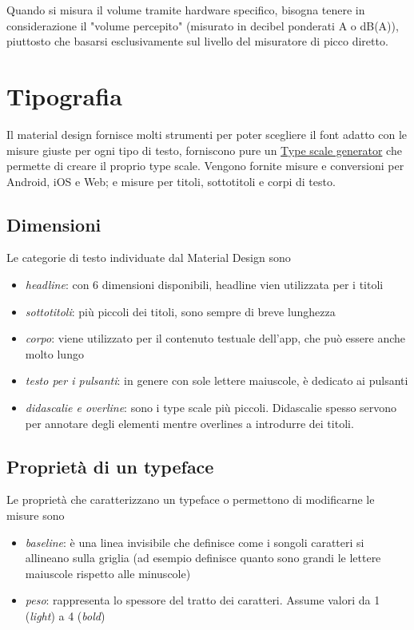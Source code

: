 \documentclass[12pt, a4paper]{report}
\begin{document}
                Quando si misura il volume tramite hardware specifico, bisogna tenere in considerazione il "volume percepito" (misurato in decibel ponderati A o dB(A)), piuttosto che basarsi esclusivamente sul livello del misuratore di picco diretto.




	\section{Tipografia}
		Il material design fornisce molti strumenti per poter scegliere il font adatto con le misure giuste per ogni tipo di testo, forniscono pure un \href{https://material.io/design/typography/the-type-system.html#type-scale}{Type scale generator} che permette di creare il proprio type scale.
		Vengono fornite misure e conversioni per Android, iOS e Web; e misure per titoli, sottotitoli e corpi di testo.
		
		\subsection{Dimensioni}
		Le categorie di testo individuate dal Material Design sono
		\begin{itemize}
			\item \textit{headline}: con 6 dimensioni disponibili, headline vien utilizzata per i titoli
			\item \textit{sottotitoli}: più piccoli dei titoli, sono sempre di breve lunghezza
			\item \textit{corpo}: viene utilizzato per il contenuto testuale dell'app, che può essere anche molto lungo
			\item \textit{testo per i pulsanti}: in genere con sole lettere maiuscole, è dedicato ai pulsanti
			\item \textit{didascalie e overline}: sono i type scale più piccoli. Didascalie spesso servono per annotare degli elementi mentre overlines a introdurre dei titoli.
		\end{itemize}
		
	\subsection{Proprietà di un typeface}
		Le proprietà che caratterizzano un typeface o permettono di modificarne le misure sono
		\begin{itemize}
			\item \textit{baseline}: è una linea invisibile che definisce come i songoli caratteri si allineano sulla griglia (ad esempio definisce quanto sono grandi le lettere maiuscole rispetto alle minuscole)
			\item \textit{peso}: rappresenta lo spessore del tratto dei caratteri. Assume valori da 1 (\textit{light}) a 4 (\textit{bold})
		\end{itemize}
		
\end{document}
